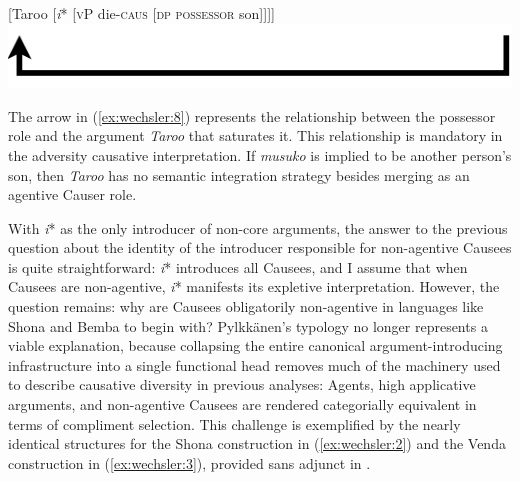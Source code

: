 \documentclass[output=paper,modfonts,nonflat]{langsci/langscibook}
\begin{document}
\ea\label{ex:wechsler:8}
{[Taroo [\textit{i}* [\textsc{vP} die-\textsc{caus} [\textsc{dp} \textsc{possessor} son]]]]} \\
                  
\includegraphics[width=\textwidth]{figures/wechsler-img002.png}
\z

The arrow in (\ref{ex:wechsler:8}) represents the relationship between the possessor role and the argument \textit{Taroo} that saturates it. This relationship is mandatory in the adversity causative interpretation. If \textit{musuko} is implied to be another person’s son, then \textit{Taroo} has no semantic integration strategy besides merging as an agentive Causer role. 

With \textit{i}* as the only introducer of non-core arguments, the answer to the previous question about the identity of the introducer responsible for non-agentive Causees is quite straightforward: \textit{i}* introduces all Causees, and I assume that when Causees are non-agentive, \textit{i}* manifests its expletive interpretation. However, the question remains: why are Causees obligatorily non-agentive in languages like Shona and Bemba to begin with? Pylkkänen’s typology no longer represents a viable explanation, because collapsing the entire canonical argument-introducing infrastructure into a single functional head removes much of the machinery used to describe causative diversity in previous analyses: Agents, high applicative arguments, and non-agentive Causees are rendered categorially equivalent in terms of compliment selection. This challenge is exemplified by the nearly identical structures for the Shona construction in (\ref{ex:wechsler:2}) and the Venda construction in (\ref{ex:wechsler:3}), provided sans adjunct in .
  
\end{document}
